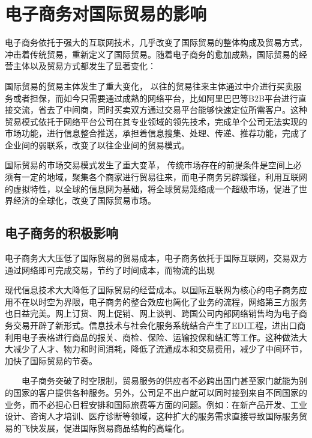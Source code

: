 \chapter{电子商务对国际贸易的影响}
电子商务依托于强大的互联网技术，几乎改变了国际贸易的整体构成及贸易方式，冲击着传统贸易，重新定义了国际贸易。随着电子商务的愈加成熟，国际贸易的经营主体以及贸易方式都发生了显著变化：

国际贸易的贸易主体发生了重大变化，
以往的贸易往来主体通过中介进行买卖服务或者担保，而如今只需要通过成熟的网络平台，比如阿里巴巴等B2B平台进行直接交流，省去了中间商，同时买卖双方通过交易平台能够快速定位所需客户。这种贸易模式依托于网络平台公司在其专业领域的领先技术，完成单个公司无法实现的市场功能，进行信息整合推送，承担着信息搜集、处理、传递、推荐功能，完成了企业间的弱联系，改变了以往企业间的贸易模式。

国际贸易的市场交易模式发生了重大变革，
传统市场存在的前提条件是空间上必须有一定的地域，聚集各个商家进行贸易往来，而电子商务另辟蹊径，利用互联网的虚拟特性，以全球的信息网为基础，将全球贸易笼络成一个超级市场，促进了世界经济的全球化，改变了国际贸易市场。

\section{电子商务的积极影响}
电子商务大大压低了国际贸易的贸易成本，电子商务依托于国际互联网，交易双方通过网络即可完成交易，节约了时间成本，而物流的出现



现代信息技术大大降低了国际贸易的经营成本。以国际互联网为核心的电子商务应用不在以时空为界限，电子商务的整合效应也简化了业务的流程，网络第三方服务也日益完美。网上订货、网上促销、网上谈判、跨国公司内部网络销售均为电子商务交易开辟了新形式。信息技术与社会化服务系统结合产生了EDI工程，进出口商利用电子表格进行商品的报关、商检、保险、运输投保和结汇等工作。这种做法大大减少了人才、物力和时间消耗，降低了流通成本和交易费用，减少了中间环节，加快了国际贸易的节奏。


　　电子商务突破了时空限制，贸易服务的供应者不必跨出国门甚至家门就能为别的国家的客户提供各种服务。另外，公司足不出户就可以同时接到来自不同国家的业务，而不必担心日程安排和国际旅费等方面的问题。例如：在新产品开发、工业设计、咨询人才培训、医疗诊断等领域，这种扩大的服务需求直接导致国际服务贸易的飞快发展，促进国际贸易商品结构的高端化。

